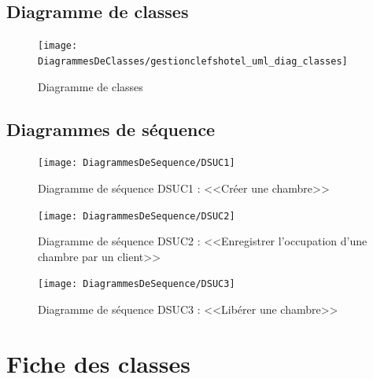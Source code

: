 \documentclass[11pt,article]{article}
\begin{document}
\subsection{Diagramme de classes}

\begin{figure}[h!]
  \texttt{[image: DiagrammesDeClasses/gestionclefshotel\_uml\_diag\_classes]}
  \caption{Diagramme de classes}
  \label{umlet_diag_classes}
\end{figure}

\newpage

\subsection{Diagrammes de séquence}

\begin{figure}[h!]
  \texttt{[image: DiagrammesDeSequence/DSUC1]}
  \caption{Diagramme de séquence DSUC1 : <<Créer une chambre>>}
  \label{umlet_diag_seq1}
\end{figure}

\newpage

\begin{figure}[h!]
  \texttt{[image: DiagrammesDeSequence/DSUC2]}
  \caption{Diagramme de séquence DSUC2 : <<Enregistrer l'occupation d'une chambre par un client>>}
  \label{umlet_diag_seq2}
\end{figure}

\newpage

\begin{figure}[h!]
  \texttt{[image: DiagrammesDeSequence/DSUC3]}
  \caption{Diagramme de séquence DSUC3 : <<Libérer une chambre>>}
  \label{umlet_diag_seq3}
\end{figure}

\newpage

\section{Fiche des classes}
\end{document}
